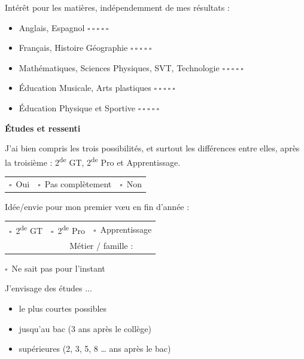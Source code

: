 \documentclass[11pt]{article}
\newcommand{\checkbox}{\(\square\)}
\newcommand{\choix}[1]{\checkbox\ #1}
\newcommand{\ligne}{{\color{gray!60}\hrulefill}}
\begin{document}
Intérêt pour les matières, indépendemment de mes résultats :

\newcommand{\avis}{\hfill \(\square\ \square\ \square\ \square\ \square\)}
\begin{itemize}[topsep=0pt]
  \item Anglais, Espagnol \avis
  \item Français, Histoire Géographie \avis
  \item Mathématiques, Sciences Physiques, SVT, Technologie \avis
  \item Éducation Musicale, Arts plastiques \avis
  \item Éducation Physique et Sportive \avis
\end{itemize}
\newpage
\begin{tcolorbox}[colback=orange!10!white, colframe=orange!80!black]
\begin{center}
\Large\textbf{Études et ressenti}
\end{center}
\end{tcolorbox}

J'ai bien compris les trois possibilités, et surtout les différences entre elles, après la troisième : 2\textsuperscript{de} GT, 2\textsuperscript{de} Pro et Apprentissage.

\begin{tabularx}{\textwidth}{Y Y Y}
\choix{Oui} & \choix{Pas complètement} & \choix{Non}
\end{tabularx}

\vspace{10pt}
Idée/envie pour mon premier vœu en fin d'année :

\begin{tabularx}{\textwidth}{Y | Y Y}
\choix{2\textsuperscript{de} GT} & \choix{2\textsuperscript{de} Pro} & \choix{Apprentissage}\\
[0.4em]
& \multicolumn{2}{c}{Métier / famille : \ligne }
\end{tabularx}
\begin{center}
\choix{Ne sait pas pour l'instant}
\end{center}

\vspace{10pt}
J'envisage des études ...

\begin{itemize}[label=\square, topsep=0pt]
\item le plus courtes possibles
\item jusqu'au bac (3 ans après le collège)
\item supérieures (2, 3, 5, 8 … ans après le bac)
\end{itemize}
\end{document}
